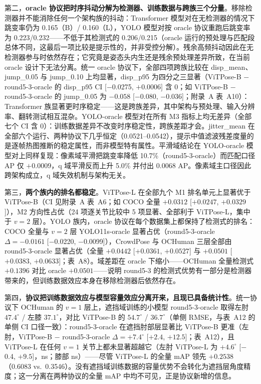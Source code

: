 \documentclass[10pt,conference]{IEEEtran}
\begin{document}
第二，\textbf{oracle 协议把时序抖动分解为检测器、训练数据与跨族三个分量}。移除检测器并不能消除任何一个架构族的抖动：Transformer 模型对在无检测器的情况下跳变率仍为 0.165（B）/ 0.160（L），YOLO 模型对按 oracle 协议重跑后跳变率为 0.223/0.232——不低于其检测式的 0.206/0.215（oracle 运行的预处理与匹配段总体不同，这最后一项比较是提示性的，并非受控分解）。残余高频抖动因此在无检测器参与时依然存在；它究竟是姿态头内生还是残余预处理差异所致，在当前 oracle 设计下无法分离。统一 oracle 协议下，全部四项跨族比较在 disp\_mean、jump\_0.05 与 jump\_0.10 上均显著，disp\_p95 为四分之三显著（ViTPose-B $-$ round5-3-oracle 的 disp\_p95 CI [$-$0.0275, $+0.0006]$ 含 0；如 ViTPose-B $-$ round5-3-oracle 的 jump\_0.05 为 $-0.058$ [$-$0.080, $-$0.036]；附录~A 表~A10）：Transformer 族显著更时序稳定——这是跨族差异，其中架构与预处理、输入分辨率、翻转测试相互混杂。YOLO-oracle 模型对在所有 M3 指标上均无差异（全部七个 CI 含 0）：训练数据差异不改变时序稳定性，跨族差距才会。jitter\_mean 在全部六个运行、两种协议下几乎恒定（0.0521--0.0542），提示中值滤波残差度量的是逐帧热图推断的稳定属性，而非模型特有属性。平滑域结论在 YOLO-oracle 模型对上同样复现：像素域平滑把跳变率降低 10.7\%（round5-3-oracle）而匹配口径 AP 仅 $+0.0009$，q 域平滑反而上升 5.0\% 并付出 0.0068 AP。像素域主口径因此跨架构成立，q 域失效机制与架构无关。

第三，\textbf{两个族内的排名都稳定}。ViTPose-L 在全部九个 M1 排名单元上显著优于 ViTPose-B（CI 见附录~A 表~A6；如 COCO 全量 $+0.0312$ [$+0.0247$, $+0.0329$]），M2 方向性占优（24 项逐关节比较中 5 项显著、全部利于 ViTPose-L，集中于 $v{=}2$ 层）。YOLO 族内，oracle 协议在每个数据集上都保持了检测式的排名：COCO 全量与 $v{=}2$ 层 YOLO11s-oracle 显著占优（round5-3-oracle $\Delta=-0.0161$ [$-$0.0220, $-$0.0099]），CrowdPose 与 OCHuman 三层全部由 round5-3-oracle 显著占优（全量 $+0.0442$ [$+0.0361$, $+0.0527$] 与 $+0.0501$ [$+0.0383$, $+0.0633$]；表~A8）。域差距在 oracle 下缩小——OCHuman 全量检测式 $+0.1396$ 对比 oracle $+0.0501$——说明 round5-3 的检测式优势有一部分是检测器带来的，但训练数据效应本身在移除检测器后依然存在。

第四，\textbf{协议把训练数据效应与模型容量效应分离开来，且现已具备统计性}。统一协议下 OCHuman 的 $v{=}1$ 层上，遮挡域训练的小模型 round5-3-oracle 取得左肘 $47.4^{\circ}$ / 左膝 $37.1^{\circ}$，对比 ViTPose-B 的 $54.7^{\circ}$ / $36.7^{\circ}$（单侧 RMSE，与表~A12 的单侧 CI 口径一致）：round5-3-oracle 在遮挡肘部层显著比 ViTPose-B 更准（左肘，ViTPose-B $-$ round5-3-oracle $\Delta=+7.4^{\circ}$ [$+2.4$, $+12.5$]；表~A12），且 ViTPose-L 在任何 $v{=}1$ 关节上都未显著超越它（左肘 ViTPose-L 为 $+4.6^{\circ}$ [$-$0.4, $+9.5$]，ns；膝部 ns）——尽管 ViTPose-L 的全量 mAP 领先 $+0.2538$（0.6083 vs.\ 0.3546）。没有遮挡域训练数据的容量优势不会转化为遮挡层角度精度；这一分离在两种协议的全量 mAP 中均不可见，正是协议新增的信息。
\end{document}
